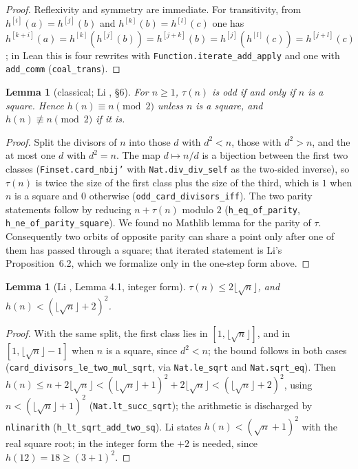 \documentclass[11pt]{article}
\theoremstyle{plain}
\newtheorem{lemma}[theorem]{Lemma}
\theoremstyle{definition}
\begin{document}
\begin{proof}
Reflexivity and symmetry are immediate. For transitivity, from $h^{[i]}(a)=h^{[j]}(b)$ and $h^{[k]}(b)=h^{[l]}(c)$ one has $h^{[k+i]}(a)=h^{[k]}(h^{[j]}(b))=h^{[j+k]}(b)=h^{[j]}(h^{[l]}(c))=h^{[j+l]}(c)$; in Lean this is four rewrites with \texttt{Function.iterate\_add\_apply} and one with \texttt{add\_comm} (\texttt{coal\_trans}).
\end{proof}

\begin{lemma}[classical; Li \cite{Li26}, \S 6]
\label{lem:parity}
For $n\ge 1$, $\tau(n)$ is odd if and only if $n$ is a square. Hence $h(n)\equiv n \pmod 2$ unless $n$ is a square, and $h(n)\not\equiv n \pmod 2$ if it is.
\end{lemma}

\begin{proof}
Split the divisors of $n$ into those $d$ with $d^2<n$, those with $d^2>n$, and the at most one $d$ with $d^2=n$. The map $d\mapsto n/d$ is a bijection between the first two classes (\texttt{Finset.card\_nbij'} with \texttt{Nat.div\_div\_self} as the two-sided inverse), so $\tau(n)$ is twice the size of the first class plus the size of the third, which is $1$ when $n$ is a square and $0$ otherwise (\texttt{odd\_card\_divisors\_iff}). The two parity statements follow by reducing $n+\tau(n)$ modulo $2$ (\texttt{h\_eq\_of\_parity}, \texttt{h\_ne\_of\_parity\_square}). We found no Mathlib lemma for the parity of $\tau$. Consequently two orbits of opposite parity can share a point only after one of them has passed through a square; that iterated statement is Li's Proposition~6.2, which we formalize only in the one-step form above.
\end{proof}

\begin{lemma}[Li \cite{Li26}, Lemma 4.1, integer form]
\label{lem:sqrt}
$\tau(n)\le 2\lfloor\sqrt n\rfloor$, and $h(n) < (\lfloor\sqrt n\rfloor+2)^2$.
\end{lemma}

\begin{proof}
With the same split, the first class lies in $[1,\lfloor\sqrt n\rfloor]$, and in $[1,\lfloor\sqrt n\rfloor-1]$ when $n$ is a square, since $d^2<n$; the bound follows in both cases (\texttt{card\_divisors\_le\_two\_mul\_sqrt}, via \texttt{Nat.le\_sqrt} and \texttt{Nat.sqrt\_eq}). Then $h(n)\le n+2\lfloor\sqrt n\rfloor<(\lfloor\sqrt n\rfloor+1)^2+2\lfloor\sqrt n\rfloor<(\lfloor\sqrt n\rfloor+2)^2$, using $n<(\lfloor\sqrt n\rfloor+1)^2$ (\texttt{Nat.lt\_succ\_sqrt}); the arithmetic is discharged by \texttt{nlinarith} (\texttt{h\_lt\_sqrt\_add\_two\_sq}). Li states $h(n)<(\sqrt n+1)^2$ with the real square root; in the integer form the $+2$ is needed, since $h(12)=18\ge(3+1)^2$.
\end{proof}
\end{document}
